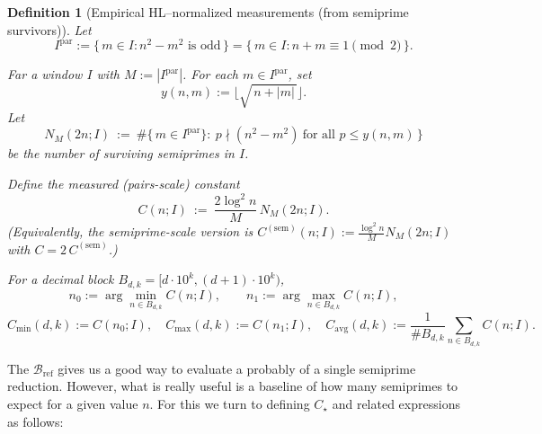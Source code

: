 \documentclass[11pt]{article}
\theoremstyle{inline}
\theoremstyle{break}
\theoremstyle{break}
\theoremstyle{break}
\theoremstyle{break}
\theoremstyle{break}
\theoremstyle{break}
\theoremstyle{break}
\newtheorem{definition}{Definition}
\theoremstyle{inline}
\newcommand{\tavg}{{\scriptscriptstyle\mathrm{avg}}}
\newcommand{\tref}{{\scriptscriptstyle\mathrm{ref}}}
\newcommand{\Cmeas}{C}              %
\newcommand{\Nmeas}{n}              %
\newcommand{\Bref}{\mathcal{B}_\tref}
\newcommand{\Ipar}{I^{\mathrm{par}}}
\begin{document}
\begin{definition}[Empirical HL–normalized measurements (from semiprime survivors)]\label{semiprime-survivors}
Let
\begin{equation}
\Ipar := \{\, m\in I : n^2-m^2 \text{ is odd} \,\}
= \{\, m\in I : n+m \equiv 1 \pmod 2 \,\}.
\end{equation}

Far a window \(I\) with \(M:=\left|\Ipar\right|\).
For each \( m \in \Ipar \), set
\begin{equation}
y(n,m):=\bigl\lfloor \sqrt{\,n+|m|\,}\bigr\rfloor .
\end{equation}
Let
\begin{equation}
N_M(2n;I)\ :=\ \#\{\,m\in \Ipar\}:\ p\nmid (n^2-m^2)\ \text{for all }p\le y(n,m)\,\}
\end{equation}
be the number of surviving \emph{semiprimes} in \(I\).

Define the measured (pairs-scale) constant
\begin{equation}
\Cmeas(n;I)\ :=\ \frac{2\log^2 n}{M}\,N_M(2n;I).
\end{equation}
(Equivalently, the semiprime-scale version is
\(\Cmeas^{(\mathrm{sem})}(n;I):=\frac{\log^2 n}{M}N_M(2n;I)\) with
\(\Cmeas=2\,\Cmeas^{(\mathrm{sem})}\).)

For a decimal block \(B_{d,k}=[d\cdot10^k,(d+1)\cdot10^k)\),
\begin{equation}
\Nmeas_0:=\arg\min_{n\in B_{d,k}}\Cmeas(n;I),\qquad
\Nmeas_1:=\arg\max_{n\in B_{d,k}}\Cmeas(n;I),
\end{equation}
\begin{equation}
\Cmeas_{\min}(d,k):=\Cmeas(\Nmeas_0;I),\quad
\Cmeas_{\max}(d,k):=\Cmeas(\Nmeas_1;I),\quad
\Cmeas_{\tavg}(d,k):=\frac{1}{\#B_{d,k}}\sum_{n\in B_{d,k}}\Cmeas(n;I).
\end{equation}
\end{definition}

The \( \Bref \) gives us a good way to evaluate a probably of a single semiprime reduction.  However, what is really useful is a baseline of how many semiprimes to expect for a given value \( n \).  For this we turn to defining \( C_\star \) and related expressions as follows:
\end{document}
